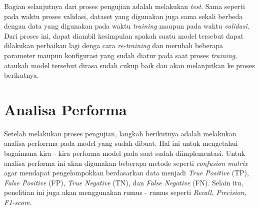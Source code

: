 Bagian selanjutnya dari proses pengujian adalah melakukan \textit{test}. Sama seperti pada waktu proses validasi, dataset yang digunakan juga sama sekali berbeda dengan data yang digunakan pada waktu \textit{training} maupun pada waktu \textit{validasi}. Dari proses ini, dapat diambil kesimpulan apakah suatu model tersebut dapat dilakukan perbaikan lagi denga cara \textit{re-training} dan merubah beberapa parameter maupun konfigurasi yang sudah diatur pada saat proses \textit{training}, ataukah model tersebut dirasa sudah cukup baik dan akan melanjutkan ke proses berikutnya.

\section{Analisa Performa}

Setelah melakukan proses pengujian, langkah berikutnya adalah melakukan analisa perforrma pada model yang sudah dibuat. Hal ini untuk mengetahui bagaimana kira - kira performa model pada saat sudah diimplementasi. Untuk analisa performa ini akan digunakan beberapa metode seperti \textit{confusion matrix} agar mendapat pengelompokkan berdasarkan data menjadi \textit{True Positive} (TP), \textit{False Positive} (FP), \textit{True Negative} (TN), dan \textit{False Negative} (FN). Selain itu, penelitian ini juga akan menggunakan rumus - rumus seperti \textit{Recall, Precision, F1-score}.

